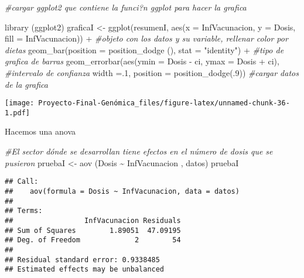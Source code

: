 \documentclass[
]{article}
\newenvironment{Shaded}{\begin{snugshade}}{\end{snugshade}}
\newcommand{\AttributeTok}[1]{\textcolor[rgb]{0.77,0.63,0.00}{#1}}
\newcommand{\CommentTok}[1]{\textcolor[rgb]{0.56,0.35,0.01}{\textit{#1}}}
\newcommand{\DecValTok}[1]{\textcolor[rgb]{0.00,0.00,0.81}{#1}}
\newcommand{\FunctionTok}[1]{\textcolor[rgb]{0.00,0.00,0.00}{#1}}
\newcommand{\NormalTok}[1]{#1}
\newcommand{\OtherTok}[1]{\textcolor[rgb]{0.56,0.35,0.01}{#1}}
\newcommand{\SpecialCharTok}[1]{\textcolor[rgb]{0.00,0.00,0.00}{#1}}
\newcommand{\StringTok}[1]{\textcolor[rgb]{0.31,0.60,0.02}{#1}}
\begin{document}
\begin{Shaded}
\begin{Highlighting}[]
\CommentTok{\#cargar ggplot2 que contiene la funci?n ggplot para hacer la grafica}

\FunctionTok{library}\NormalTok{ (ggplot2) }
\NormalTok{graficaI }\OtherTok{\textless{}{-}} \FunctionTok{ggplot}\NormalTok{(resumenI, }\FunctionTok{aes}\NormalTok{(}\AttributeTok{x =}\NormalTok{ InfVacunacion, }\AttributeTok{y =}\NormalTok{ Dosis, }\AttributeTok{fill =}\NormalTok{ InfVacunacion)) }\SpecialCharTok{+} \CommentTok{\#objeto con los datos y su variable, rellenar color por dietas}
    \FunctionTok{geom\_bar}\NormalTok{(}\AttributeTok{position =} \FunctionTok{position\_dodge}\NormalTok{ (), }\AttributeTok{stat =} \StringTok{"identity"}\NormalTok{) }\SpecialCharTok{+} \CommentTok{\#tipo de grafica de barras}
    \FunctionTok{geom\_errorbar}\NormalTok{(}\FunctionTok{aes}\NormalTok{(}\AttributeTok{ymin =}\NormalTok{ Dosis }\SpecialCharTok{{-}}\NormalTok{ ci, }\AttributeTok{ymax =}\NormalTok{ Dosis }\SpecialCharTok{+}\NormalTok{ ci), }\CommentTok{\#intervalo de confianza}
                  \AttributeTok{width =}\NormalTok{.}\DecValTok{1}\NormalTok{, }
                  \AttributeTok{position =} \FunctionTok{position\_dodge}\NormalTok{(.}\DecValTok{9}\NormalTok{)) }\CommentTok{\#cargar datos de la grafica}
\end{Highlighting}
\end{Shaded}

\texttt{[image: Proyecto-Final-Genómica\_files/figure-latex/unnamed-chunk-36-1.pdf]}

Hacemos una anova

\begin{Shaded}
\begin{Highlighting}[]
\CommentTok{\#El sector dónde se desarrollan tiene efectos en el número de dosis que se pusieron}
\NormalTok{pruebaI }\OtherTok{\textless{}{-}} \FunctionTok{aov}\NormalTok{ (Dosis }\SpecialCharTok{\textasciitilde{}}\NormalTok{ InfVacunacion , datos)}
\NormalTok{pruebaI}
\end{Highlighting}
\end{Shaded}

\begin{verbatim}
## Call:
##    aov(formula = Dosis ~ InfVacunacion, data = datos)
## 
## Terms:
##                 InfVacunacion Residuals
## Sum of Squares        1.89051  47.09195
## Deg. of Freedom             2        54
## 
## Residual standard error: 0.9338485
## Estimated effects may be unbalanced
\end{verbatim}
\end{document}
